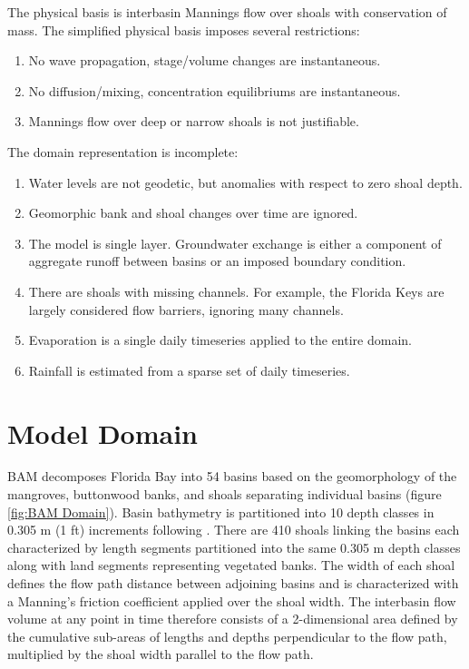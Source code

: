 The physical basis is interbasin Mannings flow over shoals with conservation of mass.  The simplified physical basis imposes several restrictions:

\begin{enumerate}
  \itemsep-8pt
  \item No wave propagation, stage/volume changes are instantaneous.
  \item No diffusion/mixing, concentration equilibriums are instantaneous.
  \item Mannings flow over deep or narrow shoals is not justifiable.
\end{enumerate}

\vspace{12pt}
\noindent The domain representation is incomplete:

\begin{enumerate}
  \itemsep-8pt
  \item Water levels are not geodetic, but anomalies with respect to zero shoal depth. 
  \item Geomorphic bank and shoal changes over time are ignored.
  \item The model is single layer.  Groundwater exchange is either a component of aggregate runoff between basins or an imposed boundary condition.
  \item There are shoals with missing channels. For example, the Florida Keys are largely considered flow barriers, ignoring many channels.
  \item Evaporation is a single daily timeseries applied to the entire domain.
  \item Rainfall is estimated from a sparse set of daily timeseries.
\end{enumerate}


\clearpage 
\section{Model Domain}
\label{sec:Model Domain}
BAM decomposes Florida Bay into 54 basins based on the geomorphology of the mangroves, buttonwood banks, and shoals separating individual basins (figure \ref{fig:BAM Domain}).  Basin bathymetry is partitioned into 10 depth classes in 0.305 m (1 ft) increments following \citet{Cosby2010}.  There are 410 shoals linking the basins each characterized by length segments partitioned into the same 0.305 m depth classes along with land segments representing vegetated banks.  The width of each shoal defines the flow path distance between adjoining basins and is characterized with a Manning's friction coefficient applied over the shoal width.  The interbasin flow volume at any point in time therefore consists of a 2-dimensional area defined by the cumulative sub-areas of lengths and depths perpendicular to the flow path, multiplied by the shoal width parallel to the flow path. \\


